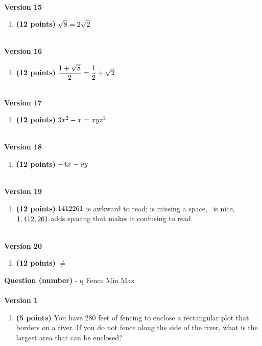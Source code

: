 \documentclass[12pt]{amsart}
\begin{document}
\begin{enumerate}[resume]
\vfill 
 \end{enumerate}$ $ \\ {\bf Version 15} \\\begin{enumerate}[resume]
\item {\bf (12 points)} 
  $\sqrt{8} = 2 \sqrt{2}$ 
\vfill 
 \end{enumerate}$ $ \\ {\bf Version 16} \\\begin{enumerate}[resume]
\item {\bf (12 points)} 
 $\dfrac{1+\sqrt{\rootfourtwo}}{2} = \dfrac{1}{2} + \ifthenelse{\wowfourtwo = 1}{}{\wowfourtwo} \sqrt{\infourtwo}$

\vfill 
 \end{enumerate}$ $ \\ {\bf Version 17} \\\begin{enumerate}[resume]
\item {\bf (12 points)} 
  $3x^{2}-x^{} = xyz^{3}$ 
\vfill 
 \end{enumerate}$ $ \\ {\bf Version 18} \\\begin{enumerate}[resume]
\item {\bf (12 points)} 
  $-4x^{} -9y^{}$ 
\vfill 
 \end{enumerate}$ $ \\ {\bf Version 19} \\\begin{enumerate}[resume]
\item {\bf (12 points)} 
 $1412261$ is awkward to read; \nicefourfour is missing a space, \nicefourfour\ is nice, $1,412,261$ adds spacing that makes it confusing to read. 
\vfill 
 \end{enumerate}$ $ \\ {\bf Version 20} \\\begin{enumerate}[resume]
\item {\bf (12 points)} 
  \goodfourfour $\neq$ \badfourfour 
\vfill 
 \end{enumerate}\newpage\newpage\def \x{70}\def \y{140}\def \L{280}\def \area{9800}{\Large{\bf Question (number)}} - q Fence Min Max\\ $ $ \\ {\bf Version 1} \\\begin{enumerate}[resume]
\item {\bf (5 points)} 
 You have $\L$ feet of fencing to enclose a rectangular plot that borders on a river. If you do not fence along the side of the river, what is the largest area that can be enclosed? \\


\end{enumerate}
\end{document}
